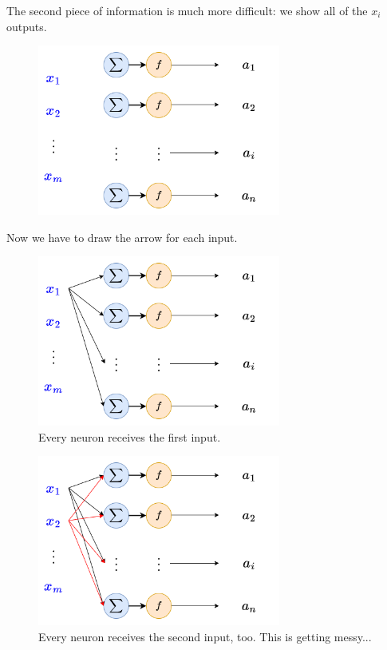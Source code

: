         The second piece of information is much more difficult: we show all of the $x_i$ outputs.
        
        \begin{figure}[H]
            \centering
            \includegraphics[width=80mm,scale=0.4]{images/nn_images/layers_with_input.png}
        \end{figure}
        
        Now we have to draw the arrow for each input.
        
        \begin{figure}[H]
            \centering
            \includegraphics[width=80mm,scale=0.4]{images/nn_images/layers_one_neuron_input.png}
            \caption*{Every neuron receives the first input.}
        \end{figure}
        
        \begin{figure}[H]
            \centering
            \includegraphics[width=80mm,scale=0.4]{images/nn_images/layers_two_neuron_input.png}
            \caption*{Every neuron receives the second input, too. This is getting messy...}
        \end{figure}
        
